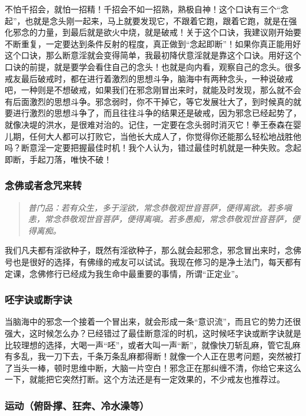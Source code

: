 \documentclass{ctexart}
\begin{document}
不怕千招会，就怕一招精！千招会不如一招熟，熟极自神！这个口诀有三个“念起”，也就是念头刚一起来，马上就要发现它，不跟着它跑，跟着它跑，就是在强化邪念的力量，到最后就是欲火中烧，就是破戒！关于这个口诀，我建议刚开始要不断重复，一定要达到条件反射的程度，真正做到“念起即断”！如果你真正能用好这个口诀，那么断意淫就会变得简单，我最初降伏意淫就是靠这个口诀。用好这个口诀的前提，就是要学会看住自己的念头！也就是向内看，观察自己的念头。很多戒友最后破戒时，都在进行着激烈的思想斗争，脑海中有两种念头，一种说破戒吧，一种则是不想破戒，如果我们在邪念刚冒出来时，就能及时发现，那么就不会有后面激烈的思想斗争。邪念弱时，你不干掉它，等它发展壮大了，到时候真的就要进行激烈的思想斗争了，而且往往斗争的结果还是破戒，因为邪念已经起势了，就像决堤的洪水，是很难对治的。记住，一定要在念头弱时消灭它！拳王泰森在婴儿期，任何大人都可以打败它，当他长大成人了，你觉得你还能那么轻松地战胜他吗？断意淫一定要把握最佳时机！我个人认为，错过最佳时机就是一种失败。念起即断，手起刀落，唯快不破！

\subsubsection{念佛或者念咒来转}

\begin{quote}\it
    普门品：若有众生，多于淫欲，常念恭敬观世音菩萨，便得离欲。若多嗔恚，常念恭敬观世音菩萨，便得离嗔。若多愚痴，常念恭敬观世音菩萨，便得离痴。
\end{quote}

我们凡夫都有淫欲种子，既然有淫欲种子，那么就会起邪念，邪念冒出来时，念佛号也是很好的选择，有佛缘的戒友可以试试。我现在修习的是净土法门，每天都有定课，念佛修行已经成为我生命中最重要的事情，所谓“正定业”。


\subsubsection{呸字诀或断字诀}

当脑海中的邪念一个接着一个冒出来，就会形成一条“意识流”，而且它的势力还很强大，这时候怎么办？已经错过了最佳断意淫的时机，这时候呸字诀或断字诀就是比较理想的选择，大喝一声“呸”，或者大叫一声“断”，就像快刀斩乱麻，管它乱麻有多乱，我一刀下去，千条万条乱麻都得断！就像一个人正在思考问题，突然被打了当头一棒，顿时思维中断，大脑一片空白！邪念正在那纠缠不清，你给它来这么一下，就能把它突然打断。这个方法还是有一定效果的，不少戒友也推荐过。

\subsubsection{运动（俯卧撑、狂奔、冷水澡等）}
\end{document}
